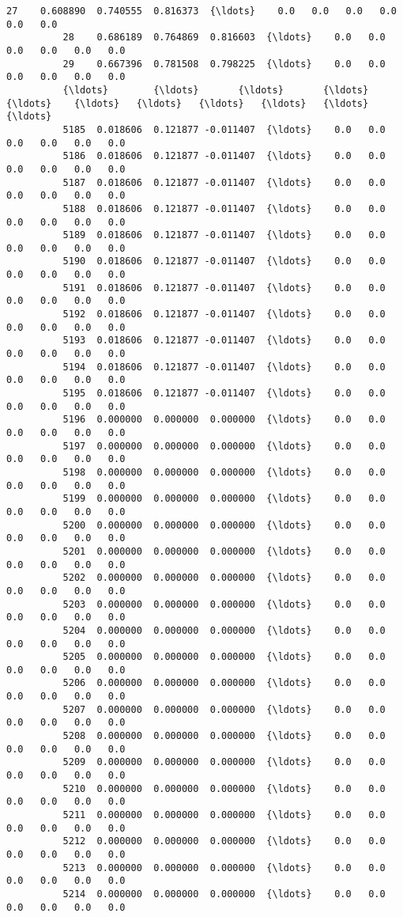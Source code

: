 \documentclass[11pt]{article}
\begin{document}
\begin{Verbatim}[commandchars=\\\{\}]
          27    0.608890  0.740555  0.816373  {\ldots}    0.0   0.0   0.0   0.0   0.0   0.0   
          28    0.686189  0.764869  0.816603  {\ldots}    0.0   0.0   0.0   0.0   0.0   0.0   
          29    0.667396  0.781508  0.798225  {\ldots}    0.0   0.0   0.0   0.0   0.0   0.0   
          {\ldots}        {\ldots}       {\ldots}       {\ldots}  {\ldots}    {\ldots}   {\ldots}   {\ldots}   {\ldots}   {\ldots}   {\ldots}   
          5185  0.018606  0.121877 -0.011407  {\ldots}    0.0   0.0   0.0   0.0   0.0   0.0   
          5186  0.018606  0.121877 -0.011407  {\ldots}    0.0   0.0   0.0   0.0   0.0   0.0   
          5187  0.018606  0.121877 -0.011407  {\ldots}    0.0   0.0   0.0   0.0   0.0   0.0   
          5188  0.018606  0.121877 -0.011407  {\ldots}    0.0   0.0   0.0   0.0   0.0   0.0   
          5189  0.018606  0.121877 -0.011407  {\ldots}    0.0   0.0   0.0   0.0   0.0   0.0   
          5190  0.018606  0.121877 -0.011407  {\ldots}    0.0   0.0   0.0   0.0   0.0   0.0   
          5191  0.018606  0.121877 -0.011407  {\ldots}    0.0   0.0   0.0   0.0   0.0   0.0   
          5192  0.018606  0.121877 -0.011407  {\ldots}    0.0   0.0   0.0   0.0   0.0   0.0   
          5193  0.018606  0.121877 -0.011407  {\ldots}    0.0   0.0   0.0   0.0   0.0   0.0   
          5194  0.018606  0.121877 -0.011407  {\ldots}    0.0   0.0   0.0   0.0   0.0   0.0   
          5195  0.018606  0.121877 -0.011407  {\ldots}    0.0   0.0   0.0   0.0   0.0   0.0   
          5196  0.000000  0.000000  0.000000  {\ldots}    0.0   0.0   0.0   0.0   0.0   0.0   
          5197  0.000000  0.000000  0.000000  {\ldots}    0.0   0.0   0.0   0.0   0.0   0.0   
          5198  0.000000  0.000000  0.000000  {\ldots}    0.0   0.0   0.0   0.0   0.0   0.0   
          5199  0.000000  0.000000  0.000000  {\ldots}    0.0   0.0   0.0   0.0   0.0   0.0   
          5200  0.000000  0.000000  0.000000  {\ldots}    0.0   0.0   0.0   0.0   0.0   0.0   
          5201  0.000000  0.000000  0.000000  {\ldots}    0.0   0.0   0.0   0.0   0.0   0.0   
          5202  0.000000  0.000000  0.000000  {\ldots}    0.0   0.0   0.0   0.0   0.0   0.0   
          5203  0.000000  0.000000  0.000000  {\ldots}    0.0   0.0   0.0   0.0   0.0   0.0   
          5204  0.000000  0.000000  0.000000  {\ldots}    0.0   0.0   0.0   0.0   0.0   0.0   
          5205  0.000000  0.000000  0.000000  {\ldots}    0.0   0.0   0.0   0.0   0.0   0.0   
          5206  0.000000  0.000000  0.000000  {\ldots}    0.0   0.0   0.0   0.0   0.0   0.0   
          5207  0.000000  0.000000  0.000000  {\ldots}    0.0   0.0   0.0   0.0   0.0   0.0   
          5208  0.000000  0.000000  0.000000  {\ldots}    0.0   0.0   0.0   0.0   0.0   0.0   
          5209  0.000000  0.000000  0.000000  {\ldots}    0.0   0.0   0.0   0.0   0.0   0.0   
          5210  0.000000  0.000000  0.000000  {\ldots}    0.0   0.0   0.0   0.0   0.0   0.0   
          5211  0.000000  0.000000  0.000000  {\ldots}    0.0   0.0   0.0   0.0   0.0   0.0   
          5212  0.000000  0.000000  0.000000  {\ldots}    0.0   0.0   0.0   0.0   0.0   0.0   
          5213  0.000000  0.000000  0.000000  {\ldots}    0.0   0.0   0.0   0.0   0.0   0.0   
          5214  0.000000  0.000000  0.000000  {\ldots}    0.0   0.0   0.0   0.0   0.0   0.0   
          

\end{Verbatim}
\end{document}
